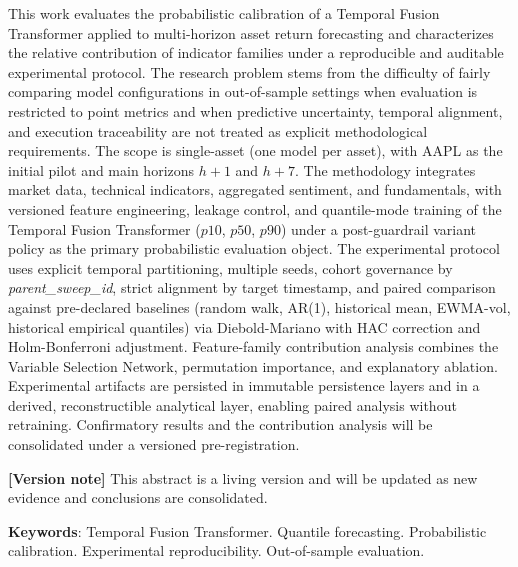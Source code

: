 \begin{resumo}[Abstract]

This work evaluates the probabilistic calibration of a Temporal Fusion Transformer applied to multi-horizon asset return forecasting and characterizes the relative contribution of indicator families under a reproducible and auditable experimental protocol. The research problem stems from the difficulty of fairly comparing model configurations in out-of-sample settings when evaluation is restricted to point metrics and when predictive uncertainty, temporal alignment, and execution traceability are not treated as explicit methodological requirements. The scope is single-asset (one model per asset), with AAPL as the initial pilot and main horizons $h+1$ and $h+7$. The methodology integrates market data, technical indicators, aggregated sentiment, and fundamentals, with versioned feature engineering, leakage control, and quantile-mode training of the Temporal Fusion Transformer ($p10$, $p50$, $p90$) under a post-guardrail variant policy as the primary probabilistic evaluation object. The experimental protocol uses explicit temporal partitioning, multiple seeds, cohort governance by \textit{parent\_sweep\_id}, strict alignment by target timestamp, and paired comparison against pre-declared baselines (random walk, AR(1), historical mean, EWMA-vol, historical empirical quantiles) via Diebold-Mariano with HAC correction and Holm-Bonferroni adjustment. Feature-family contribution analysis combines the Variable Selection Network, permutation importance, and explanatory ablation. Experimental artifacts are persisted in immutable persistence layers and in a derived, reconstructible analytical layer, enabling paired analysis without retraining. Confirmatory results and the contribution analysis will be consolidated under a versioned pre-registration.

\textbf{[Version note]} This abstract is a living version and will be updated as new evidence and conclusions are consolidated.

\textbf{Keywords}: Temporal Fusion Transformer. Quantile forecasting. Probabilistic calibration. Experimental reproducibility. Out-of-sample evaluation.

\end{resumo}
